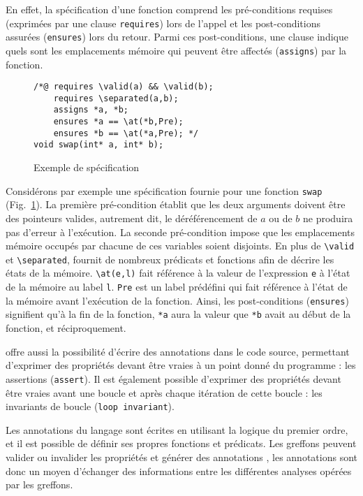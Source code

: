En effet, la spécification d'une fonction comprend les pré-conditions requises
(exprimées par une clause \lstinline{requires}) lors de l'appel et les
post-conditions assurées (\lstinline{ensures}) lors du retour. Parmi ces
post-conditions, une clause indique quels sont les emplacements mémoire qui
peuvent être affectés (\lstinline{assigns}) par la fonction.


\begin{figure}[h]
\begin{lstlisting}
/*@ requires \valid(a) && \valid(b);
    requires \separated(a,b);
    assigns *a, *b;
    ensures *a == \at(*b,Pre);
    ensures *b == \at(*a,Pre); */
void swap(int* a, int* b);
\end{lstlisting}
\caption{Exemple de spécification \acsl}
\label{fig:acsl-spec}
\end{figure}


Considérons par exemple une spécification fournie pour une fonction
\lstinline{swap}
(Fig.~\ref{fig:acsl-spec}). La première pré-condition établit que les deux
arguments doivent être des pointeurs valides, autrement dit, le déréférencement
de $a$ ou de $b$ ne produira pas d'erreur à l'exécution. La seconde
pré-condition impose que les emplacements mémoire occupés par chacune de ces
variables soient disjoints. En plus de \lstinline{\valid} et
\lstinline{\separated}, \acsl fournit de nombreux prédicats et
fonctions afin de décrire les états de la mémoire. \lstinline{\at(e,l)}
fait référence à la valeur de l'expression \lstinline{e} à l'état de la mémoire
au label \lstinline{l}. \lstinline{Pre} est un label prédéfini qui fait
référence à l'état de la mémoire avant l'exécution de la fonction. Ainsi, les
post-conditions (\lstinline{ensures}) signifient qu'à la fin de la fonction,
\lstinline{*a} aura la valeur que \lstinline{*b} avait au
début de la fonction, et réciproquement.


\acsl offre aussi la possibilité d'écrire des annotations dans le code
source, permettant d'exprimer des propriétés devant être vraies à un point donné
du programme : les assertions (\lstinline{assert}).
Il est également possible d'exprimer des propriétés devant être vraies avant une
boucle et après chaque itération de cette boucle : les invariants de boucle
(\lstinline{loop invariant}).


Les annotations du langage \acsl sont écrites en utilisant la logique
du premier ordre, et il est possible de définir ses propres fonctions et
prédicats.
Les greffons peuvent valider ou invalider les propriétés \acsl et
générer des annotations \acsl, les annotations sont donc un moyen
d'échanger des informations entre les différentes analyses opérées par les
greffons.


